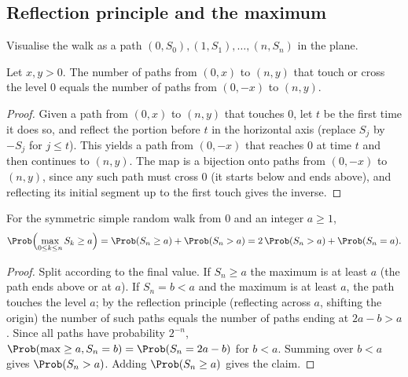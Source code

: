\subsection{Reflection principle and the maximum}

Visualise the walk as a path $(0,S_0),(1,S_1),\dots,(n,S_n)$ in the plane.

\begin{theorem}\label{thm:reflection}
Let $x,y>0$. The number of paths from $(0,x)$ to $(n,y)$ that touch or cross the level $0$
equals the number of paths from $(0,-x)$ to $(n,y)$.
\end{theorem}
\begin{proof}
Given a path from $(0,x)$ to $(n,y)$ that touches $0$, let $t$ be the first time it
does so, and reflect the portion before $t$ in the horizontal axis (replace $S_j$ by
$-S_j$ for $j\le t$). This yields a path from $(0,-x)$ that reaches $0$ at time $t$ and
then continues to $(n,y)$. The map is a bijection onto paths from $(0,-x)$ to $(n,y)$,
since any such path must cross $0$ (it starts below and ends above), and reflecting its
initial segment up to the first touch gives the inverse.
\end{proof}

\begin{theorem}\label{thm:maxwalk}
For the symmetric simple random walk from $0$ and an integer $a\ge1$,
\[
\Prob\Bigl(\max_{0\le k\le n}S_k\ge a\Bigr)=\Prob(S_n\ge a)+\Prob(S_n>a)
=2\,\Prob(S_n>a)+\Prob(S_n=a).
\]
\end{theorem}
\begin{proof}
Split according to the final value. If $S_n\ge a$ the maximum is at least $a$ (the path
ends above or at $a$). If $S_n=b<a$ and the maximum is at least $a$, the path touches the
level $a$; by the reflection principle (reflecting across $a$, shifting the origin) the
number of such paths equals the number of paths ending at $2a-b>a$. Since all paths
have probability $2^{-n}$, $\Prob(\max\ge a,S_n=b)=\Prob(S_n=2a-b)$ for $b<a$.
Summing over $b<a$ gives $\Prob(S_n>a)$. Adding $\Prob(S_n\ge a)$ gives the claim.
\end{proof}

